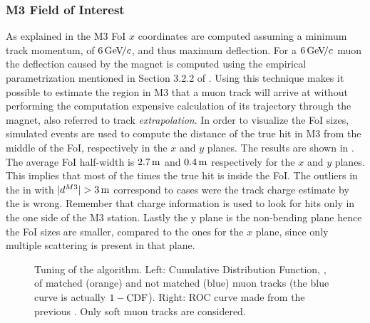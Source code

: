 \subsubsection{M3 Field of Interest}
As explained in  the M3 FoI $x$ coordinates are computed assuming a minimum track momentum, of $6{\mathrm{\,Ge\kern -0.1em V\!/}c}$,
and thus maximum deflection. For a $6{\mathrm{\,Ge\kern -0.1em V\!/}c}$ muon the deflection caused by the \lhcb magnet is computed using the empirical
parametrization mentioned in Section 3.2.2 of \cite{roelThesis}. Using this technique makes it possible to estimate the region
in M3 that a muon track will arrive at without performing the computation
expensive calculation of its trajectory through the \lhcb magnet, also referred to track {\it extrapolation}. In order to visualize the FoI sizes,
simulated events are used to compute the distance of the true hit in M3 from the middle of the FoI, respectively in the $x$ and $y$ planes.
The results are shown in . The average FoI half-width is $2.7\rm \,m$ and $0.4\rm \,m$ respectively for the $x$ and $y$ planes.
This implies that most of the times the true hit is inside the FoI. The outliers in the  in with $|d^{M3}|>3\m$
correspond to cases were the track charge estimate by the \ttracker is wrong. Remember that charge information is used to
look for hits only in the one side of the M3 station. Lastly the y plane is the non-bending plane hence the FoI sizes
are smaller, compared to the ones for the $x$ plane, since only multiple scattering is present in that plane.

\begin{figure}[t]
  \centering
  \begin{subfigure}{0.5\textwidth}
    \raggedright
    \scalebox{0.6}{}
    \caption{}
    \label{mvm_cdf}
  \end{subfigure}%
  \hfill%
  \begin{subfigure}{0.5\textwidth}
    \raggedleft
    \scalebox{0.6}{}
    \caption{}
    \label{mvm_roc}
  \end{subfigure}
  \caption{Tuning of the \mvTTm algorithm. Left: \chisq Cumulative Distribution Function, \cdf,
           of matched (orange) and not matched (blue) muon tracks (the blue curve is actually $1-\mbox{CDF}$).
           Right: ROC curve made from the previous \chisq \cdf. Only soft muon tracks are considered. }
 \label{mvm_tuning}
\end{figure}

